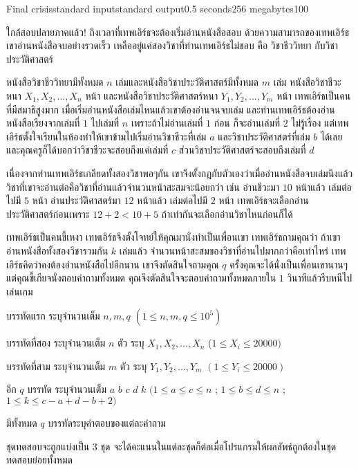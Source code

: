 \documentclass[11pt,a4paper]{article}
\begin{document}
\begin{problem}{Final crisis}{standard input}{standard output}{0.5 seconds}{256 megabytes}{100}

ใกล้สอบปลายภาคแล้ว! ถึงเวลาที่เทพเอิร์ธจะต้องเริ่มอ่านหนังสือสอบ ด้วยความสามารถของเทพเอิร์ธ เขาอ่านหนังสือจบอย่างรวดเร็ว เหลืออยู่แค่สองวิชาที่ท่านเทพเอิร์ธไม่ชอบ คือ วิชาชีววิทยา กับวิชาประวัติศาสตร์

 หนังสือวิชาชีววิทยามีทั้งหมด $n$ เล่มและหนังสือวิชาประวัติศาสตร์มีทั้งหมด $m$ เล่ม หนังสือวิชาชีวะหนา $X_1, X_2, ..., X_n $ หน้า และหนังสือวิชาประวัติศาสตร์หนา $Y_1, Y_2, ..., Y_m$ หน้า เทพเอิร์ธเป็นคนที่มีสมาธิสูงมาก เมื่อเริ่มอ่านหนังสือเล่มไหนแล้วเขาต้องอ่านจนจบเล่ม และท่านเทพเอิร์ธต้องอ่านหนังสือเรียงจากเล่มที่ $1$ ไปเล่มที่ $n$ เพราะถ้าไม่อ่านเล่มที่ $1$ ก่อน ก็จะอ่านเล่มที่ $2$ ไม่รู้เรื่อง แต่เทพเอิร์ธตั้งใจเรียนในห้องทำให้เขาข้ามไปเริ่มอ่านวิชาชีวะที่เล่ม $a$ และวิชาประวัติศาสตร์ที่เล่ม $b$ ได้เลย และคุณครูก็ได้บอกว่าวิชาชีวะจะสอบถึงแค่เล่มที่ $c$ ส่วนวิชาประวัติศาสตร์จะสอบถึงเล่มที่ $d$

เนื่องจากท่านเทพเอิร์ธเกลียดทั้งสองวิชาพอๆกัน เขาจึงตั้งกฎกับตัวเองว่าเมื่ออ่านหนังสือจบเล่มนึงแล้ววิชาที่เขาจะอ่านต่อคือวิชาที่อ่านแล้วจำนวนหน้าสะสมจะน้อยกว่า เช่น อ่านชีวะมา $10$ หน้าแล้ว เล่มต่อไปมี $5$ หน้า อ่านประวัติศาสตร์มา $12$ หน้าแล้ว เล่มต่อไปมี $2$ หน้า เทพเอิร์ธจะเลือกอ่านประวัติศาสตร์ก่อนเพราะ $12+2 < 10+5$ ถ้าเท่ากันจะเลือกอ่านวิชาไหนก่อนก็ได้

เทพเอิร์ธเป็นคนขี้เหงา เทพเอิร์ธจึงตั้งโจทย์ให้คุณมานั่งทำเป็นเพื่อนเขา เทพเอิร์ธถามคุณว่า ถ้าเขาอ่านหนังสือทั้งสองวิชารวมกัน $k$ เล่มแล้ว จำนวนหน้าสะสมของวิชาที่อ่านไปมากกว่าคือเท่าไหร่ เทพเอิร์ธคิดว่าคงต้องอ่านหนังสือไปอีกนาน เขาจึงตัดสินใจถามคุณ $q$ ครั้งคุณจะได้นั่งเป็นเพื่อนเขานานๆ แต่คุณขี้เกียจนั่งตอบคำถามทั้งหมด คุณจึงตัดสินใจจะตอบคำถามทั้งหมดภายใน $1$ วินาทีแล้วรีบหนีไปเล่นเกม


\InputFile
บรรทัดแรก ระบุจำนวนเต็ม $ n,m,q$ $( 1\leq n,m,q\leq10^5)$

บรรทัดที่สอง ระบุจำนวนเต็ม $n$ ตัว ระบุ $X_1, X_2, ..., X_n$ ($1\leq X_i\leq20000
)$

บรรทัดที่สาม ระบุจำนวนเต็ม $m$ ตัว ระบุ $Y_1,Y_2,...,Y_m$ $(1\leq Y_i\leq 20000)$

อีก $q$ บรรทัด ระบุจำนวนเต็ม $a$ $b$ $c$ $d$ $k$ $(1\leq a\leq c\leq n $ ; $1\leq b\leq d\leq n $ ; $ 1\leq k\leq c-a+d-b+2)$


\OutputFile
มีทั้งหมด $q$ บรรทัดระบุคำตอบของแต่ละคำถาม

\Scoring
ชุดทดสอบจะถูกแบ่งเป็น 3 ชุด จะได้คะแนนในแต่ละชุดก็ต่อเมื่อโปรแกรมให้ผลลัพธ์ถูกต้องในชุดทดสอบย่อยทั้งหมด


\end{problem}
\end{document}
